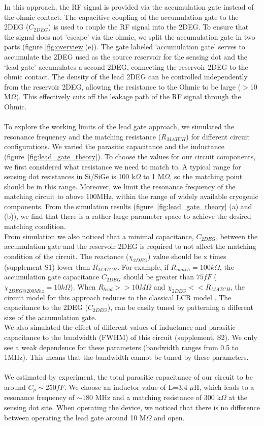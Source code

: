 \documentclass{article}
\begin{document}
In this approach, the RF signal is provided via the accumulation gate\cite{Volk2019} instead of the ohmic contact. The capacitive coupling of the accumulation gate to the 2DEG ($C_{2DEG}$) is used to couple the RF signal into the 2DEG. To ensure that the signal does not 'escape' via the ohmic, we  split the accumulation gate in two parts (figure \ref{fig:overview}(e)).
The gate labeled ‘accumulation gate’ serves to accumulate the 2DEG used as the source reservoir for the sensing dot and the ‘lead gate’ accumulates a second 2DEG, connecting the reservoir 2DEG to the ohmic contact. The density of the lead 2DEG can be controlled independently from the reservoir 2DEG, allowing the resistance to the Ohmic to be large ($>$10 M$\Omega$). This effectively cuts off the leakage path of the RF signal through the Ohmic.
\\ \\
To explore the working limits of the lead gate approach, we simulated the resonance frequency and the matching resistance ($R_{MATCH}$) for different circuit configurations. We varied the parasitic capacitance and the inductance (figure\ \ref{fig:lead_gate_theory}). To choose the values for our circuit components, we first considered what resistance we need to match to. A typical range for sensing dot resistances in Si/SiGe is 100 k$\Omega$ to 1 M$\Omega$, so the matching point should be in this range. Moreover, we limit the resonance frequency of the matching circuit to above 100MHz, within the range of widely available cryogenic components. From the simulation results (figure\ \ref{fig:lead_gate_theory} (a) and (b)), we find that there is a rather large parameter space to achieve the desired matching condition.
\\
From simulation we also noticed that a minimal capacitance, $C_{2DEG}$, between the accumulation gate and the reservoir 2DEG is required to not affect the matching condition of the circuit. The reactance ($\chi_{2DEG}$) value should be x times (supplement S1) lower than $R_{MATCH}$. For example, if $R_{match}=100k\Omega$, the accumulation gate capacitance $C_{2DEG}$ should be greater than $75fF$ ($\chi_{2DEG@200 Mhz} = 10k\Omega$). When $R_{lead} >> 10M\Omega$ and $\chi_{2DEG} << R_{MATCH}$, the circuit model for this approach reduces to the classical LCR model
\cite{taskinen2008radio}. The capacitance to the 2DEG ($C_{2DEG}$), can be easily tuned by patterning a different size of the accumulation gate.
\\
We also simulated the effect of different values of inductance and parasitic capacitance to the bandwidth (FWHM) of this circuit (supplement, S2). We only see a weak dependence for these parameters (bandwidth ranges from 0.5 to 1MHz). This means that the bandwidth cannot be tuned by these parameters.
\\ \\ 
We estimated by experiment, the total parasitic capacitance of our circuit to be around $C_p \sim 250fF$. We choose an inductor value of L=3.4 $\mu$H, which leads to a resonance frequency of $\sim$180 MHz and a matching resistance of 300 k$\Omega$ at the sensing dot site.
When operating the device, we noticed that there is no difference between operating the lead gate around 10 M$\Omega$ and open.
\end{document}
